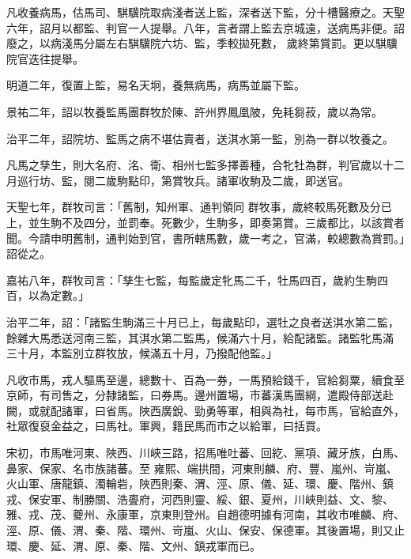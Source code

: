\begin{pinyinscope}
 凡收養病馬，估馬司、騏驥院取病淺者送上監，深者送下監，分十槽醫療之。天聖六年，詔月以都監、判官一人提舉。八年，言者謂上監去京城遠，送病馬非便。詔廢之，以病淺馬分屬左右騏驥院六坊、監，季較拋死數，
 歲終第賞罰。更以騏驥院官迭往提舉。



 明道二年，復置上監，易名天坰，養無病馬，病馬並屬下監。



 景祐二年，詔以牧養監馬團群牧於陳、許州界鳳凰陂，免耗芻菽，歲以為常。



 治平二年，詔院坊、監馬之病不堪估賣者，送淇水第一監，別為一群以牧養之。



 凡馬之孳生，則大名府、洺、衛、相州七監多擇善種，合牝牡為群，判官歲以十二月巡行坊、監，閱二歲駒點印，第賞牧兵。諸軍收駒及二歲，即送官。



 天聖七年，群牧司言：「舊制，知州軍、通判領同
 群牧事，歲終較馬死數及分已上，並生駒不及四分，並罰奉。死數少，生駒多，即奏第賞。三歲都比，以該賞者聞。今請申明舊制，通判始到官，書所轄馬數，歲一考之，官滿，較總數為賞罰。」詔從之。



 嘉祐八年，群牧司言：「孳生七監，每監歲定牝馬二千，牡馬四百，歲約生駒四百，以為定數。」



 治平二年，詔：「諸監生駒滿三十月已上，每歲點印，選牡之良者送淇水第二監，餘雜大馬悉送河南三監，其淇水第二監馬，候滿六十月，給配諸監。諸監牝馬滿
 三十月，本監別立群牧放，候滿五十月，乃撥配他監。」



 凡收市馬，戎人驅馬至邊，總數十、百為一券，一馬預給錢千，官給芻粟，續食至京師，有司售之，分隸諸監，曰券馬。邊州置場，市蕃漢馬團綱，遣殿侍部送赴闕，或就配諸軍，曰省馬。陜西廣銳、勁勇等軍，相與為社，每市馬，官給直外，社眾復裒金益之，曰馬社。軍興，籍民馬而市之以給軍，曰括買。



 宋初，市馬唯河東、陜西、川峽三路，招馬唯吐蕃、回紇、黨項、藏牙族，白馬、鼻家、保家、名市族諸蕃。至
 雍熙、端拱間，河東則麟、府、豐、嵐州、岢嵐、火山軍、唐龍鎮、濁輪砦，陜西則秦、渭、涇、原、儀、延、環、慶、階州、鎮戎、保安軍、制勝關、浩亹府，河西則靈、綏、銀、夏州，川峽則益、文、黎、雅、戎、茂、夔州、永康軍，京東則登州。自趙德明據有河南，其收市唯麟、府、涇、原、儀、渭、秦、階、環州、岢嵐、火山、保安、保德軍。其後置場，則又止環、慶、延、渭、原、秦、階、文州、鎮戎軍而已。




\end{pinyinscope}
